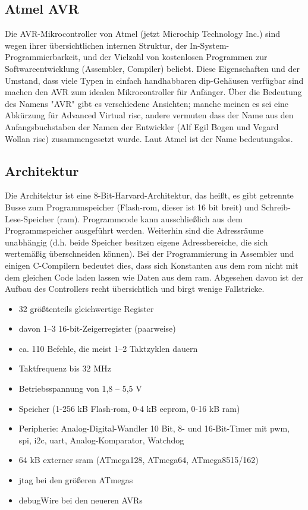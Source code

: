 \subsection{Atmel AVR}
Die AVR-Mikrocontroller von Atmel (jetzt Microchip Technology Inc.) sind wegen ihrer übersichtlichen internen Struktur, der In-System-Programmierbarkeit, und der Vielzahl von kostenlosen Programmen zur Softwareentwicklung (Assembler, Compiler) beliebt. Diese Eigenschaften und der Umstand, dass viele Typen in einfach handhabbaren \ac{dip}-Gehäusen verfügbar sind  machen den AVR zum idealen Mikrocontroller für Anfänger.
Über die Bedeutung des Namens "AVR" gibt es verschiedene Ansichten; manche meinen es sei eine Abkürzung für Advanced Virtual \ac{risc}, andere vermuten dass der Name aus den Anfangsbuchstaben der Namen der Entwickler (Alf Egil Bogen und Vegard Wollan \ac{risc}) zusammengesetzt wurde. Laut Atmel ist der Name bedeutungslos.

\subsection{Architektur}
Die Architektur ist eine 8-Bit-Harvard-Architektur, das heißt, es gibt getrennte Busse zum Programmspeicher (Flash-\ac{rom}, dieser ist 16 bit breit) und Schreib-Lese-Speicher (\ac{ram}). Programmcode kann ausschließlich aus dem Programmspeicher ausgeführt werden. Weiterhin sind die Adressräume unabhängig (d.h. beide Speicher besitzen eigene Adressbereiche, die sich wertemäßig überschneiden können). Bei der Programmierung in Assembler und einigen C-Compilern bedeutet dies, dass sich Konstanten aus dem \ac{rom} nicht mit dem gleichen Code laden lassen wie Daten aus dem \ac{ram}. Abgesehen davon ist der Aufbau des Controllers recht übersichtlich und birgt wenige Fallstricke.
\begin{itemize}
\item 32 größtenteils gleichwertige Register
\item davon 1–3 16-bit-Zeigerregister (paarweise)
\item ca. 110 Befehle, die meist 1–2 Taktzyklen dauern
\item Taktfrequenz bis 32 MHz
\item Betriebsspannung von 1,8 – 5,5 V
\item Speicher (1-256 kB Flash-\ac{rom}, 0-4 kB \ac{eeprom}, 0-16 kB \ac{ram})
\item Peripherie: Analog-Digital-Wandler 10 Bit, 8- und 16-Bit-Timer mit \ac{pwm}, \ac{spi}, \ac{i2c}, \ac{uart}, Analog-Komparator, Watchdog
\item 64 kB externer \ac{sram} (ATmega128, ATmega64, ATmega8515/162)
\item \ac{jtag} bei den größeren ATmegas
\item debugWire bei den neueren AVRs		
\end{itemize}
\cite[Architektur]{mikrocontroller-avr}

